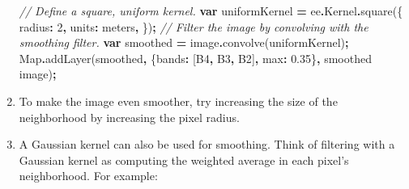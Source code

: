 \documentclass[
]{article}
\newenvironment{Shaded}{\begin{snugshade}}{\end{snugshade}}
\newcommand{\AttributeTok}[1]{\textcolor[rgb]{0.77,0.63,0.00}{#1}}
\newcommand{\BuiltInTok}[1]{#1}
\newcommand{\CommentTok}[1]{\textcolor[rgb]{0.56,0.35,0.01}{\textit{#1}}}
\newcommand{\DataTypeTok}[1]{\textcolor[rgb]{0.13,0.29,0.53}{#1}}
\newcommand{\DecValTok}[1]{\textcolor[rgb]{0.00,0.00,0.81}{#1}}
\newcommand{\FloatTok}[1]{\textcolor[rgb]{0.00,0.00,0.81}{#1}}
\newcommand{\FunctionTok}[1]{\textcolor[rgb]{0.00,0.00,0.00}{#1}}
\newcommand{\KeywordTok}[1]{\textcolor[rgb]{0.13,0.29,0.53}{\textbf{#1}}}
\newcommand{\NormalTok}[1]{#1}
\newcommand{\OperatorTok}[1]{\textcolor[rgb]{0.81,0.36,0.00}{\textbf{#1}}}
\newcommand{\StringTok}[1]{\textcolor[rgb]{0.31,0.60,0.02}{#1}}
\begin{document}
\begin{enumerate}
\begin{Shaded}
\begin{Highlighting}[]
\CommentTok{// Define a square, uniform kernel.}
\KeywordTok{var}\NormalTok{ uniformKernel }\OperatorTok{=}\NormalTok{ ee}\OperatorTok{.}\AttributeTok{Kernel}\OperatorTok{.}\FunctionTok{square}\NormalTok{(\{}
 \DataTypeTok{radius}\OperatorTok{:} \DecValTok{2}\OperatorTok{,}
 \DataTypeTok{units}\OperatorTok{:} \StringTok{\textquotesingle{}meters\textquotesingle{}}\OperatorTok{,}
\NormalTok{\})}\OperatorTok{;}
\CommentTok{// Filter the image by convolving with the smoothing filter.}
\KeywordTok{var}\NormalTok{ smoothed }\OperatorTok{=}\NormalTok{ image}\OperatorTok{.}\FunctionTok{convolve}\NormalTok{(uniformKernel)}\OperatorTok{;}
\BuiltInTok{Map}\OperatorTok{.}\FunctionTok{addLayer}\NormalTok{(smoothed}\OperatorTok{,}\NormalTok{ \{}\DataTypeTok{bands}\OperatorTok{:}\NormalTok{ [}\StringTok{\textquotesingle{}B4\textquotesingle{}}\OperatorTok{,} \StringTok{\textquotesingle{}B3\textquotesingle{}}\OperatorTok{,} \StringTok{\textquotesingle{}B2\textquotesingle{}}\NormalTok{]}\OperatorTok{,} \DataTypeTok{max}\OperatorTok{:} \FloatTok{0.35}\NormalTok{\}}\OperatorTok{,} \StringTok{\textquotesingle{}smoothed image\textquotesingle{}}\NormalTok{)}\OperatorTok{;}
\end{Highlighting}
\end{Shaded}
\item
  To make the image even smoother, try increasing the size of the neighborhood by increasing the pixel radius.
\item
  A Gaussian kernel can also be used for smoothing. Think of filtering with a Gaussian kernel as computing the weighted average in each pixel's neighborhood. For example:


\end{enumerate}
\end{document}
